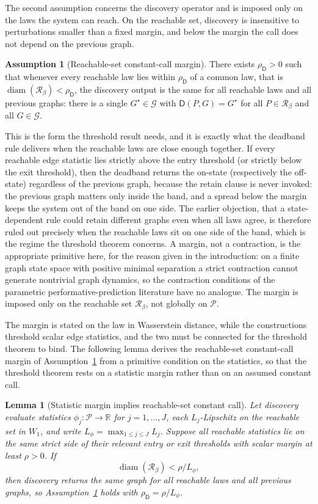 \documentclass[11pt]{article}
\theoremstyle{plain}
\newtheorem{lemma}{Lemma}
\theoremstyle{definition}
\newtheorem{assumption}{Assumption}
\newcommand{\Pcal}{\mathcal{P}}
\newcommand{\Gcal}{\mathcal{G}}
\newcommand{\Rset}{\mathcal{R}}
\newcommand{\Wone}{W_1}
\newcommand{\Dop}{\mathsf{D}}
\newcommand{\diam}{\operatorname{diam}}
\newcommand{\R}{\mathbb{R}}
\begin{document}
The second assumption concerns the discovery operator and is imposed only on the laws the system can reach. On the reachable set, discovery is insensitive to perturbations smaller than a fixed margin, and below the margin the call does not depend on the previous graph.

\begin{assumption}[Reachable-set constant-call margin]\label{ass:A2}
There exists $\rho_\Dop>0$ such that whenever every reachable law lies within $\rho_\Dop$ of a common law, that is $\diam(\Rset_\beta)<\rho_\Dop$, the discovery output is the same for all reachable laws and all previous graphs: there is a single $G^\star\in\Gcal$ with $\Dop(P,G)=G^\star$ for all $P\in\Rset_\beta$ and all $G\in\Gcal$.
\end{assumption}

This is the form the threshold result needs, and it is exactly what the deadband rule delivers when the reachable laws are close enough together. If every reachable edge statistic lies strictly above the entry threshold (or strictly below the exit threshold), then the deadband returns the on-state (respectively the off-state) regardless of the previous graph, because the retain clause is never invoked: the previous graph matters only inside the band, and a spread below the margin keeps the system out of the band on one side. The earlier objection, that a state-dependent rule could retain different graphs even when all laws agree, is therefore ruled out precisely when the reachable laws sit on one side of the band, which is the regime the threshold theorem concerns. A margin, not a contraction, is the appropriate primitive here, for the reason given in the introduction: on a finite graph state space with positive minimal separation a strict contraction cannot generate nontrivial graph dynamics, so the contraction conditions of the parametric performative-prediction literature have no analogue. The margin is imposed only on the reachable set $\Rset_\beta$, not globally on $\Pcal$.

The margin is stated on the law in Wasserstein distance, while the constructions threshold scalar edge statistics, and the two must be connected for the threshold theorem to bind. The following lemma derives the reachable-set constant-call margin of Assumption~\ref{ass:A2} from a primitive condition on the statistics, so that the threshold theorem rests on a statistic margin rather than on an assumed constant call.

\begin{lemma}[Statistic margin implies reachable-set constant call]\label{lem:bridge}
Let discovery evaluate statistics $\phi_j:\Pcal\to\R$ for $j=1,\dots,J$, each $L_j$-Lipschitz on the reachable set in $\Wone$, and write $L_\phi=\max_{1\le j\le J}L_j$. Suppose all reachable statistics lie on the same strict side of their relevant entry or exit thresholds with scalar margin at least $\rho>0$. If
\[
\diam(\Rset_\beta)<\rho/L_\phi,
\]
then discovery returns the same graph for all reachable laws and all previous graphs, so Assumption~\ref{ass:A2} holds with $\rho_\Dop=\rho/L_\phi$.
\end{lemma}
\end{document}
